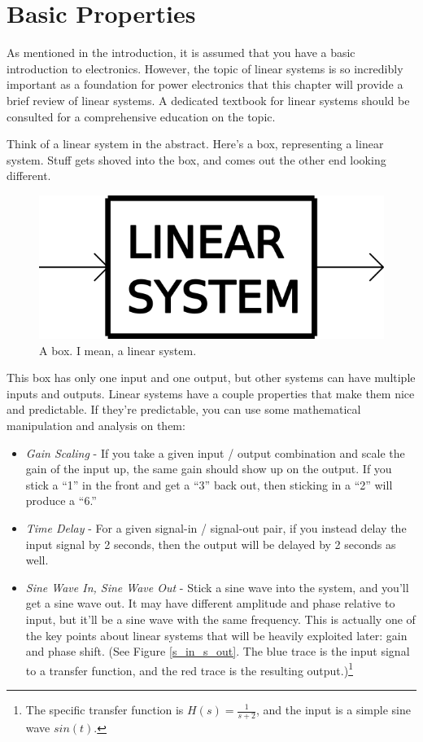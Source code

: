 \section{Basic Properties}

As mentioned in the introduction, it is assumed that you have a basic introduction to electronics. However, the topic of linear systems is so incredibly important as a foundation for power electronics that this chapter will provide a brief review of linear systems. A dedicated textbook for linear systems should be consulted for a comprehensive education on the topic.

Think of a linear system in the abstract. Here's a box, representing a linear system. Stuff gets shoved into the box, and comes out the other end looking different.

\begin{figure}[h]
\centering
\includegraphics[scale=1.0]{linear_box.png}
\caption{A box. I mean, a linear system.}\label{abox}
\end{figure}

This box has only one input and one output, but other systems can have multiple inputs and outputs. Linear systems have a couple properties that make them nice and predictable. If they're predictable, you can use some mathematical manipulation and analysis on them:

\begin{itemize}
\item \emph{Gain Scaling} - If you take a given input / output combination and scale the gain of the input up, the same gain should show up on the output. If you stick a ``1'' in the front and get a ``3'' back out, then sticking in a ``2'' will produce a ``6.''
\item \emph{Time Delay} - For a given signal-in / signal-out pair, if you instead delay the input signal by 2 seconds, then the output will be delayed by 2 seconds as well.
\item \emph{Sine Wave In, Sine Wave Out} - Stick a sine wave into the system, and you'll get a sine wave out. It may have different amplitude and phase relative to input, but it'll be a sine wave with the same frequency. This is actually one of the key points about linear systems that will be heavily exploited later: gain and phase shift. (See Figure \ref{s_in_s_out}. The blue trace is the input signal to a transfer function, and the red trace is the resulting output.)\footnote{The specific transfer function is $H(s) = \frac{1}{s+2}$, and the input is a simple sine wave $sin(t)$.}

\end{itemize}

